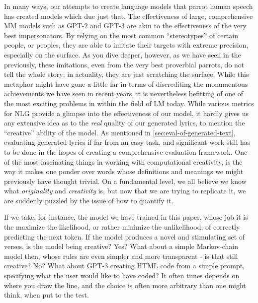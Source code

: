 In many ways, our attempts to create language models that parrot human speech has created models which due just that. The effectiveness of large, comprehensive MM models such as GPT-2 and GPT-3 are akin to the effectiveness of the very best impersonators. By relying on the most common “stereotypes” of certain people, or peoples, they are able to imitate their targets with extreme precision, especially on the surface. As you dive deeper, however, as we have seen in the previously, these imitations, even from the very best proverbial parrots, do not tell the whole story; in actuality, they are just scratching the surface. While this metaphor might have gone a little far in terms of discrediting the monumentous achievements we have seen in recent years, it is nevertheless befitting of one of the most exciting problems in within the field of LM today. While various metrics for NLG provide a glimpse into the effectiveness of our model, it hardly gives us any extensive idea as to the \textit{real} quality of our generated lyrics, to mention the “creative” ability of the model. As mentioned in \cref{sec:eval-of-generated-text}, evaluating generated lyrics if far from an easy task, and significant work still has to be done in the hopes of creating a comprehensive evaluation framework. One of the most fascinating things in working with computational creativity, is the way it makes one ponder over words whose definitions and meanings we might previously have thought trivial. On a fundamental level, we all believe we know what \textit{originality} and \textit{creativity} is, but now that we are trying to replicate it, we are suddenly puzzled by the issue of how to quantify it.

If we take, for instance, the model we have trained in this paper, whose job it is the maximize the likelihood, or rather minimize the unlikelihood, of correctly predicting the next token. If the model produces a novel and stimulating set of verses, is the model being creative? Yes? What about a simple Markov-chain model then, whose rules are even simpler and more transparent - is that still creative? No? What about GPT-3 creating HTML code from a simple prompt, specifying what the user would like to have coded? It often times depends on where you draw the line, and the choice is often more arbitrary than one might think, when put to the test.


